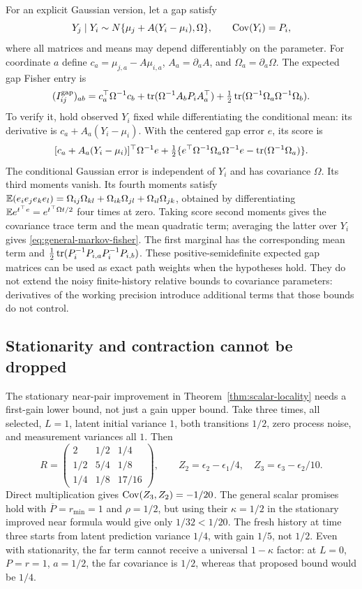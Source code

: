 For an explicit Gaussian version, let a gap satisfy
\[
 Y_j\mid Y_i\sim N\{\mu_j+A(Y_i-\mu_i),\Omega\},\qquad
 \operatorname{Cov}(Y_i)=P_i,
\]
where all matrices and means may depend differentiably on the parameter.
For coordinate $a$ define
$c_a=\mu_{j,a}-A\mu_{i,a}$, $A_a=\partial_a A$, and
$\Omega_a=\partial_a\Omega$. The expected gap Fisher entry is
\begin{equation}
 (I_{ij}^{\mathrm{gap}})_{ab}
 =c_a^\top\Omega^{-1}c_b
  +\operatorname{tr}(\Omega^{-1}A_bP_iA_a^\top)
  +\tfrac12\operatorname{tr}(\Omega^{-1}\Omega_a\Omega^{-1}\Omega_b).
 \label{eq:general-markov-fisher}
\end{equation}
To verify it, hold observed $Y_i$ fixed while differentiating the conditional
mean: its derivative is $c_a+A_a(Y_i-\mu_i)$. With the centered gap error
$e$, its score is
\[
 [c_a+A_a(Y_i-\mu_i)]^\top\Omega^{-1}e
 +\tfrac12\{e^\top\Omega^{-1}\Omega_a\Omega^{-1}e
                -\operatorname{tr}(\Omega^{-1}\Omega_a)\}.
\]
The conditional Gaussian error is independent of $Y_i$ and has covariance
$\Omega$. Its third moments vanish. Its fourth moments satisfy
$\mathbb E(e_i e_j e_k e_l)=\Omega_{ij}\Omega_{kl}
+\Omega_{ik}\Omega_{jl}+\Omega_{il}\Omega_{jk}$, obtained by differentiating
$\mathbb E e^{t^\top e}=e^{t^\top\Omega t/2}$ four times at zero.
Taking score second moments gives the covariance trace term and the mean
quadratic term; averaging the latter over $Y_i$ gives
\eqref{eq:general-markov-fisher}. The first marginal has the corresponding
mean term and $\tfrac12\operatorname{tr}(P_i^{-1}P_{i,a}P_i^{-1}P_{i,b})$.
These positive-semidefinite expected gap matrices can be used as exact
path weights when the hypotheses hold. They do not extend the noisy
finite-history relative bounds to covariance parameters: derivatives of the
working precision introduce additional terms that those bounds do not control.

\subsection{Stationarity and contraction cannot be dropped}
\label{app:locality-boundaries}
The stationary near-pair improvement in Theorem~\ref{thm:scalar-locality}
needs a first-gain lower bound, not just a gain upper bound.
Take three times, all selected, $L=1$, latent initial variance $1$, both
transitions $1/2$, zero process noise, and measurement variances all $1$.
Then
\[
 R=\begin{pmatrix}2&1/2&1/4\\1/2&5/4&1/8\\1/4&1/8&17/16\end{pmatrix},
 \qquad Z_2=\epsilon_2-\epsilon_1/4,\quad
 Z_3=\epsilon_3-\epsilon_2/10.
\]
Direct multiplication gives $\operatorname{Cov}(Z_3,Z_2)=-1/20$.
The general scalar promises hold with $\overline P=r_{\min}=1$ and
$\rho=1/2$, but using their $\kappa=1/2$ in the stationary improved
near formula would give only $1/32<1/20$. The fresh history at time three
starts from latent prediction variance $1/4$, with gain $1/5$, not $1/2$.
Even with stationarity, the far term cannot receive a universal
$1-\kappa$ factor: at $L=0$, $P=r=1$, $a=1/2$, the far covariance is
$1/2$, whereas that proposed bound would be $1/4$.

